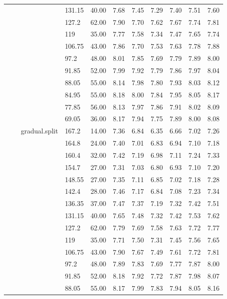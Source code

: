 \begin{longtable}{llllrrrrrrr}
   &  &  & 131.15 & 40.00 & 7.68 & 7.45 & 7.29 & 7.40 & 7.51 & 7.60 \\ 
   &  &  & 127.2 & 62.00 & 7.90 & 7.70 & 7.62 & 7.67 & 7.74 & 7.81 \\ 
   &  &  & 119 & 35.00 & 7.77 & 7.58 & 7.34 & 7.47 & 7.65 & 7.74 \\ 
   &  &  & 106.75 & 43.00 & 7.86 & 7.70 & 7.53 & 7.63 & 7.78 & 7.88 \\ 
   &  &  & 97.2 & 48.00 & 8.01 & 7.85 & 7.69 & 7.79 & 7.89 & 8.00 \\ 
   &  &  & 91.85 & 52.00 & 7.99 & 7.92 & 7.79 & 7.86 & 7.97 & 8.04 \\ 
   &  &  & 88.05 & 55.00 & 8.14 & 7.98 & 7.80 & 7.93 & 8.03 & 8.12 \\ 
   &  &  & 84.95 & 55.00 & 8.18 & 8.00 & 7.84 & 7.95 & 8.05 & 8.17 \\ 
   &  &  & 77.85 & 56.00 & 8.13 & 7.97 & 7.86 & 7.91 & 8.02 & 8.09 \\ 
   &  &  & 69.05 & 36.00 & 8.17 & 7.94 & 7.75 & 7.89 & 8.00 & 8.08 \\ 
   &  & gradual.split & 167.2 & 14.00 & 7.36 & 6.84 & 6.35 & 6.66 & 7.02 & 7.26 \\ 
   &  &  & 164.8 & 24.00 & 7.40 & 7.01 & 6.83 & 6.94 & 7.10 & 7.18 \\ 
   &  &  & 160.4 & 32.00 & 7.42 & 7.19 & 6.98 & 7.11 & 7.24 & 7.33 \\ 
   &  &  & 154.7 & 27.00 & 7.31 & 7.03 & 6.80 & 6.93 & 7.10 & 7.20 \\ 
   &  &  & 148.55 & 27.00 & 7.35 & 7.11 & 6.85 & 7.02 & 7.18 & 7.28 \\ 
   &  &  & 142.4 & 28.00 & 7.46 & 7.17 & 6.84 & 7.08 & 7.23 & 7.34 \\ 
   &  &  & 136.35 & 37.00 & 7.47 & 7.37 & 7.19 & 7.32 & 7.42 & 7.51 \\ 
   &  &  & 131.15 & 40.00 & 7.65 & 7.48 & 7.32 & 7.42 & 7.53 & 7.62 \\ 
   &  &  & 127.2 & 62.00 & 7.79 & 7.69 & 7.58 & 7.63 & 7.72 & 7.77 \\ 
   &  &  & 119 & 35.00 & 7.71 & 7.50 & 7.31 & 7.45 & 7.56 & 7.65 \\ 
   &  &  & 106.75 & 43.00 & 7.90 & 7.67 & 7.49 & 7.61 & 7.72 & 7.81 \\ 
   &  &  & 97.2 & 48.00 & 7.89 & 7.83 & 7.69 & 7.77 & 7.87 & 8.00 \\ 
   &  &  & 91.85 & 52.00 & 8.18 & 7.92 & 7.72 & 7.87 & 7.98 & 8.07 \\ 
   &  &  & 88.05 & 55.00 & 8.17 & 7.99 & 7.83 & 7.94 & 8.05 & 8.16 \\ 

\end{longtable}
